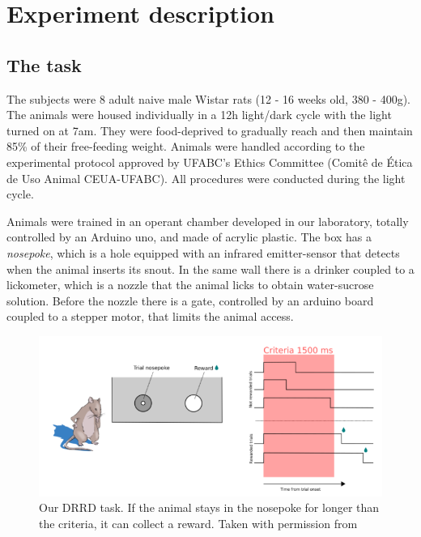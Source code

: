 
\chapter{Experiment description}
\label{chap:experiment}

\section{The task}
    The subjects were 8 adult naive male Wistar rats (12 - 16 weeks old, 380 - 400g). The animals were housed individually in a 12h light/dark cycle with the light turned on at 7am. They were food-deprived to gradually reach and then maintain 85\% of their free-feeding weight. Animals were handled according to the experimental protocol approved by UFABC's Ethics Committee (Comitê de Ética de Uso Animal CEUA-UFABC). All procedures were conducted during the light cycle.
    
    Animals were trained in an operant chamber developed in our laboratory, totally controlled by an Arduino uno, and made of acrylic plastic. The box has a \textit{nosepoke}, which is a hole equipped with an infrared emitter-sensor that detects when the animal inserts its snout. In the same wall there is a drinker coupled to a lickometer, which is a nozzle that the animal licks to obtain water-sucrose solution. Before the nozzle there is a gate, controlled by an arduino board coupled to a stepper motor, that limits the animal access. 
    
    \begin{figure}
        \centering
        \includegraphics[width=\textwidth]{figures/tarefa_eli.png}
        \caption[Our DRRD task]{Our DRRD task. If the animal stays in the nosepoke for longer than the criteria, it can collect a reward. Taken with permission from \cite{Eliezyer2018}}
        \label{fig:task}
    \end{figure}

